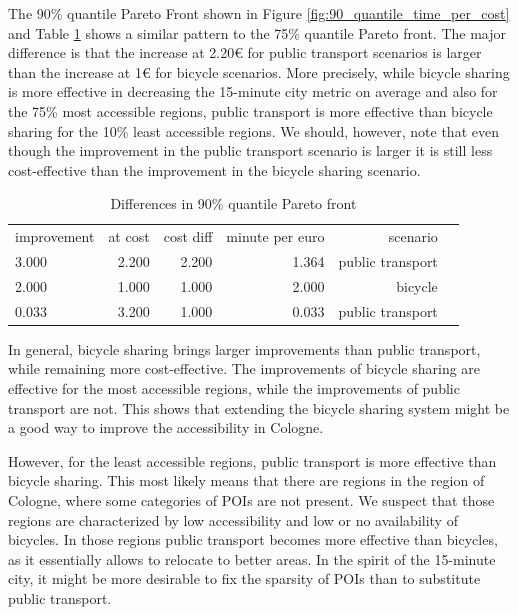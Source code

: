 The 90\% quantile Pareto Front shown in Figure \ref{fig:90_quantile_time_per_cost} and Table \ref{tab:differences_in_90_quantile_pareto_front} shows a similar pattern to the 75\% quantile Pareto front.
The major difference is that the increase at 2.20€ for public transport scenarios is larger than the increase at 1€ for bicycle scenarios.
More precisely, while bicycle sharing is more effective in decreasing the 15-minute city metric on average and also for the 75\% most accessible regions, public transport is more effective than bicycle sharing for the 10\% least accessible regions.
We should, however, note that even though the improvement in the public transport scenario is larger it is still less cost-effective than the improvement in the bicycle sharing scenario.


\begin{table}
  \caption{Differences in 90\% quantile Pareto front}
  \label{tab:differences_in_90_quantile_pareto_front}
  \begin{center}
    \begin{tabular}{lrrrrl}
     improvement & at cost & cost diff & minute per euro & scenario \\
     3.000 & 2.200 & 2.200 & 1.364 & public transport \\
     2.000 & 1.000 & 1.000 & 2.000 & bicycle \\
     0.033 & 3.200 & 1.000 & 0.033 & public transport \\
    \end{tabular}
  \end{center}
\end{table}

In general, bicycle sharing brings larger improvements than public transport, while remaining more cost-effective.
The improvements of bicycle sharing are effective for the most accessible regions, while the improvements of public transport are not.
This shows that extending the bicycle sharing system might be a good way to improve the accessibility in Cologne.

However, for the least accessible regions, public transport is more effective than bicycle sharing.
This most likely means that there are regions in the region of Cologne, where some categories of POIs are not present.
We suspect that those regions are characterized by low accessibility and low or no availability of bicycles.
In those regions public transport becomes more effective than bicycles, as it essentially allows to relocate to better areas.
In the spirit of the 15-minute city, it might be more desirable to fix the sparsity of POIs than to substitute public transport.



